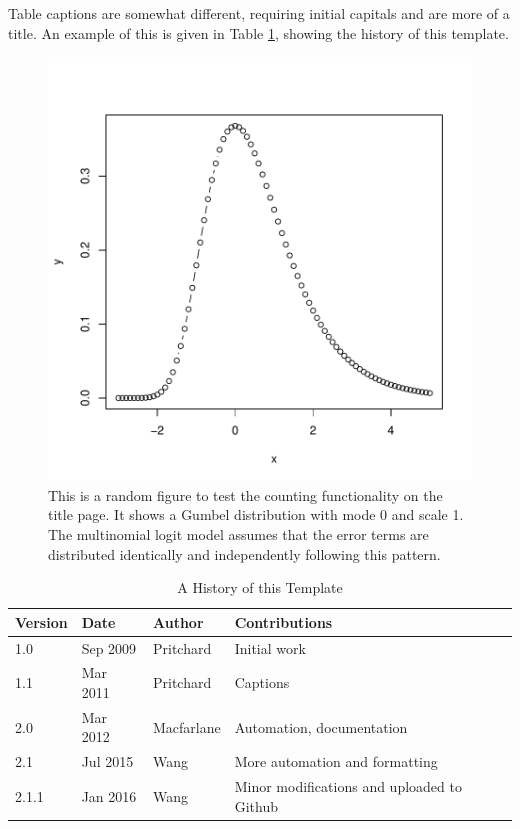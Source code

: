 \documentclass[titlepage,oneside,letterpage,12pt]{article}
\begin{document}
Table captions are somewhat different, requiring initial capitals and are more of a
title. An example of this is given in Table \ref{tab:versions}, showing the
history of this template.

\begin{figure}[t]
  \centering
\includegraphics{trb_template-gumbel}
\caption{This is a random figure to test the counting functionality on the
title page. It shows a Gumbel distribution with mode 0 and scale 1. The
multinomial logit model assumes that the error terms are distributed identically
and independently following this pattern.}
	\label{fig:trial}
\end{figure}

\begin{table}[t]
  \caption{A History of this Template}
	\label{tab:versions}
\begin{center}
	\begin{tabular}{l l l l}
Version & Date & Author & Contributions \\\hline
1.0   & Sep 2009 & Pritchard & Initial work \\
1.1   & Mar 2011 & Pritchard & Captions \\
2.0   & Mar 2012 & Macfarlane& Automation, documentation\\
2.1   & Jul 2015 & Wang      & More automation and formatting\\
2.1.1 & Jan 2016 & Wang      & Minor modifications and uploaded to Github\\\hline
\end{tabular}
\end{center}
\end{table}
\end{document}
